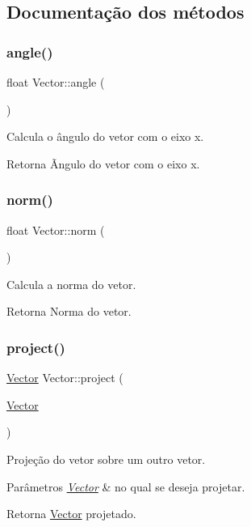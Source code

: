 \subsection{Documentação dos métodos}
\mbox{\label{classVector_ac83edd3ce21c2eea555a360f64cf0acc}} 
\subsubsection{\texorpdfstring{angle()}{angle()}}
{\footnotesize\ttfamily float Vector\+::angle (\begin{DoxyParamCaption}{ }\end{DoxyParamCaption})}

Calcula o ângulo do vetor com o eixo x. \begin{DoxyReturn}{Retorna}
Ãngulo do vetor com o eixo x. 
\end{DoxyReturn}
\mbox{\label{classVector_a4d643a71ea7c87cb77ab7bdfb26b42ba}} 
\subsubsection{\texorpdfstring{norm()}{norm()}}
{\footnotesize\ttfamily float Vector\+::norm (\begin{DoxyParamCaption}{ }\end{DoxyParamCaption})}

Calcula a norma do vetor. \begin{DoxyReturn}{Retorna}
Norma do vetor. 
\end{DoxyReturn}
\mbox{\label{classVector_a7f187d9dc1da47c2d3754e8260a4c0e7}} 
\subsubsection{\texorpdfstring{project()}{project()}}
{\footnotesize\ttfamily \hyperlink{classVector}{Vector} Vector\+::project (\begin{DoxyParamCaption}\item[{\hyperlink{classVector}{Vector}}]{ }\end{DoxyParamCaption})}

Projeção do vetor sobre um outro vetor. 
\begin{DoxyParams}{Parâmetros}
{\em \hyperlink{classVector}{Vector}} & no qual se deseja projetar. \\
\hline
\end{DoxyParams}
\begin{DoxyReturn}{Retorna}
\hyperlink{classVector}{Vector} projetado. 
\end{DoxyReturn}
\mbox{\label{classVector_ac2e3094ce0134c3509ce4ef7df78245a}} 
